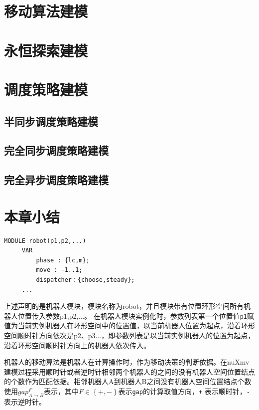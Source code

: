 \section{移动算法建模}

\section{永恒探索建模}

\section{调度策略建模}

\subsection{半同步调度策略建模}

\subsection{完全同步调度策略建模}

\subsection{完全异步调度策略建模}

\section{本章小结}






\begin{lstlisting}
MODULE robot(p1,p2,...)
     VAR
         phase : {lc,m};
         move : -1..1;
         dispatcher：{choose,steady};
     ...
\end{lstlisting}

上述声明的是机器人模块，模块名称为robot，并且模块带有位置环形空间所有机器人位置传入参数p1,p2,...。 在机器人模块实例化时，参数列表第一个位置值\verb|p1|赋值为当前实例机器人在环形空间中的位置值，以当前机器人位置为起点，沿着环形空间顺时针方向依次是p2、p3...，即参数列表是以当前实例机器人的位置为起点，沿着环形空间顺时针方向上的机器人依次传入。

机器人的移动算法是机器人在计算操作时，作为移动决策的判断依据。在nuXmv建模过程采用顺时针或者逆时针相邻两个机器人的之间的没有机器人空间位置结点的个数作为匹配依据。相邻机器人A到机器人B之间没有机器人空间位置结点个数使用$gap_{A \rightarrow B}^F$表示，其中$F \in \left\{+,-\right\}$表示\verb|gap|的计算取值方向，\verb|+| 表示顺时针，\verb|-| 表示逆时针。

